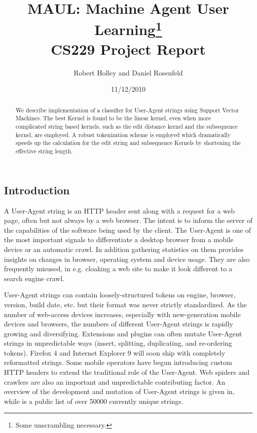 \documentclass[10pt]{article}
\title{MAUL: Machine Agent User Learning\footnote{Some unscrambling necessary.}\\ CS229 Project Report }
\author{Robert Holley and Daniel Rosenfeld}
\date{11/12/2010}
\begin{document}
\maketitle
\begin{abstract}
We describe implementation of a classifier for User-Agent strings using Support Vector Machines.  The best Kernel is found to be the linear kernel, even when more complicated string based kernels, such as the edit distance kernel and the subsequence kernel, are employed.  A robust tokenization scheme is employed which dramatically speeds up the calculation for the edit string and subsequence Kernels by shortening the effective string length. 
\end{abstract}
\begin{multicols}{2}

\section{Introduction}
A User-Agent string is an HTTP header sent along with a request for a web page, often but not always by a web browser.\cite{httprfc} The intent is to inform the server
of the capabilities of the software being used by the client. The User-Agent is
one of the most important signals to differentiate a desktop browser from a
mobile device or an automatic crawl. In addition gathering statistics on them
provides insights on changes in browser, operating system and device usage. They
are also frequently misused, in e.g. cloaking a web site to make it look
different to a search engine crawl.

User-Agent strings can contain loosely-structured tokens on engine, browser,
version, build date, etc. but their format was never strictly standardized.\cite{httprfc}
As the number of web-access devices increases, especially with new-generation
mobile devices and browsers, the numbers of different User-Agent strings is
rapidly growing and diversifying. Extensions and plugins can often mutate
User-Agent strings in unpredictable ways (insert, splitting, duplicating, and
re-ordering tokens). Firefox 4 and Internet Explorer 9 will soon ship with
completely reformatted strings. Some mobile operators have begun introducing
custom HTTP headers to extend the traditional role of the User-Agent.\cite{mobile} Web spiders and crawlers are also an important and unpredictable contributing factor.
An overview of the development and mutation of User-Agent strings is given in,\cite{history} while \cite{uatracker} is a public list of over 50000 currently unique strings.


\end{multicols}
\end{document}
